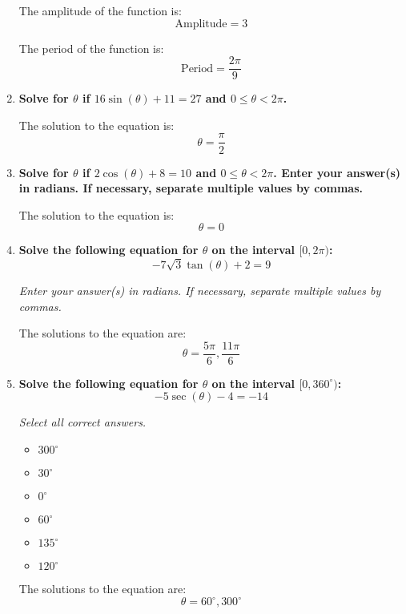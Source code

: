 \documentclass[12pt]{article}
\begin{document}
\begin{enumerate}
    The amplitude of the function is:
    \[ \text{Amplitude} = 3 \]
    
    The period of the function is:
    \[ \text{Period} = \frac{2\pi}{9} \]
    \vspace{45mm}
    
    \item \textbf{Solve for \( \theta \) if \( 16\sin(\theta) + 11 = 27 \) and \( 0 \leq \theta < 2\pi \).}
    
    The solution to the equation is:
    \[ \theta = \frac{\pi}{2} \]
    \vspace{45mm}

    \item \textbf{Solve for \( \theta \) if \( 2\cos(\theta) + 8 = 10 \) and \( 0 \leq \theta < 2\pi \). Enter your answer(s) in radians. If necessary, separate multiple values by commas.}
    
    The solution to the equation is:
    \[ \theta = 0 \]
    \vspace{45mm}

    
    \item \textbf{Solve the following equation for \( \theta \) on the interval \( [0,2\pi) \):}
    \[ -7\sqrt{3} \tan(\theta) + 2 = 9 \]
    
    \textit{Enter your answer(s) in radians. If necessary, separate multiple values by commas.}
    
    The solutions to the equation are:
    \[ \theta = \frac{5\pi}{6}, \frac{11\pi}{6} \]
    \vspace{45mm}

    
    
    \item \textbf{Solve the following equation for \( \theta \) on the interval \( [0,360^\circ) \):}
    \[ -5\sec(\theta) - 4 = -14 \]
    
    \textit{Select all correct answers.}
    
    \begin{itemize}
        \item \( 300^\circ \)
        \item \( 30^\circ \)
        \item \( 0^\circ \)
        \item \( 60^\circ \)
        \item \( 135^\circ \)
        \item \( 120^\circ \)
    \end{itemize}
    
    The solutions to the equation are:
    \[ \theta = 60^\circ, 300^\circ \]
    \vspace{45mm}

\end{enumerate}
\end{document}
